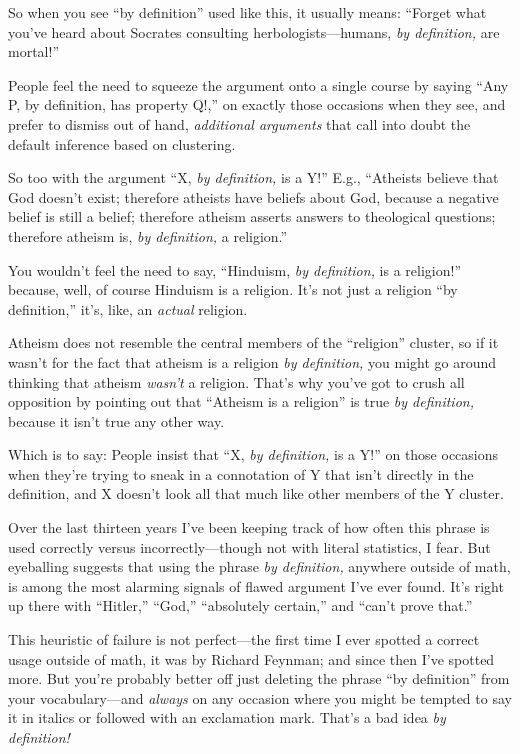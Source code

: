 {
 So when you see ``by
definition'' used like this, it usually means:
``Forget what you've heard about
Socrates consulting herbologists---humans, \textit{by definition,} are
mortal!''}

{
 People feel the need to squeeze the argument onto a single course
by saying ``Any P, by definition, has property
Q!,'' on exactly those occasions when they see, and
prefer to dismiss out of hand, \textit{additional arguments} that call
into doubt the default inference based on clustering.}

{
 So too with the argument ``X, \textit{by
definition,} is a Y!'' E.g.,
``Atheists believe that God doesn't
exist; therefore atheists have beliefs about God, because a negative
belief is still a belief; therefore atheism asserts answers to
theological questions; therefore atheism is, \textit{by definition,} a
religion.''}

{
 You wouldn't feel the need to say,
``Hinduism, \textit{by definition,} is a
religion!'' because, well, of course Hinduism is a
religion. It's not just a religion
``by definition,''
it's, like, an \textit{actual} religion.}

{
 Atheism does not resemble the central members of the
``religion'' cluster, so if it
wasn't for the fact that atheism is a religion
\textit{by definition,} you might go around thinking that atheism
\textit{wasn't} a religion. That's why
you've got to crush all opposition by pointing out that
``Atheism is a religion'' is true
\textit{by definition,} because it isn't true any other
way.}

{
 Which is to say: People insist that ``X,
\textit{by definition,} is a Y!'' on those occasions
when they're trying to sneak in a connotation of Y that
isn't directly in the definition, and X
doesn't look all that much like other members of the Y
cluster.}

{
 Over the last thirteen years I've been keeping
track of how often this phrase is used correctly versus
incorrectly---though not with literal statistics, I fear. But
eyeballing suggests that using the phrase \textit{by definition,}
anywhere outside of math, is among the most alarming signals of flawed
argument I've ever found. It's right up
there with ``Hitler,''
``God,''
``absolutely certain,'' and
``can't prove
that.''}

{
 This heuristic of failure is not perfect---the first time I ever
spotted a correct usage outside of math, it was by Richard Feynman; and
since then I've spotted more. But
you're probably better off just deleting the phrase
``by definition'' from your
vocabulary---and \textit{always} on any occasion where you might be
tempted to say it in italics or followed with an exclamation mark.
That's a bad idea \textit{by definition!}}

